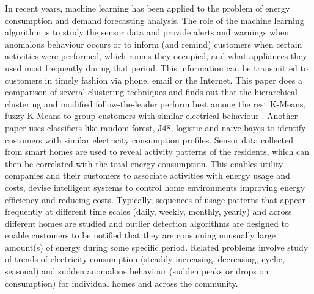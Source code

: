 \documentclass{sig-alternate}
\begin{document}
In recent years, machine learning has been applied to the problem of energy consumption and demand forecasting analysis. The role of the machine learning algorithm is to study the sensor data and provide alerts and warnings when anomalous behaviour occurs or to inform (and remind) customers when certain activities were performed, which rooms they occupied, and what appliances they used most frequently during that period. This information can be transmitted to customers in timely fashion via phone, email or the Internet.
This paper \cite{1626400} does a comparison of several clustering techniques and finds out that  the hierarchical clustering and modified follow-the-leader perform best among the rest K-Means, fuzzy K-Means to group customers with similar electrical behaviour \cite{5620917}. Another paper \cite{Wijaya} uses classifiers like random forest, J48, logistic and naive bayes to identify customers with similar electricity consumption profiles.
Sensor data collected from smart homes are used to reveal activity patterns of the residents, which can then be correlated with the total energy consumption. This enables utility companies and their customers to associate activities with energy usage and costs, devise intelligent systems to control home environments improving energy efficiency and reducing costs. Typically, sequences of usage patterns that appear frequently at different time scales (daily, weekly, monthly, yearly) and across different homes are studied and 
outlier detection algorithms are designed to enable customers to be notified that they are consuming unusually large amount(s) of energy during some specific period. Related problems involve study of trends of electricity consumption (steadily increasing, decreasing, cyclic, seasonal) and sudden anomalous behaviour (sudden peaks or drops on consumption) for individual homes and across the community.
\end{document}
